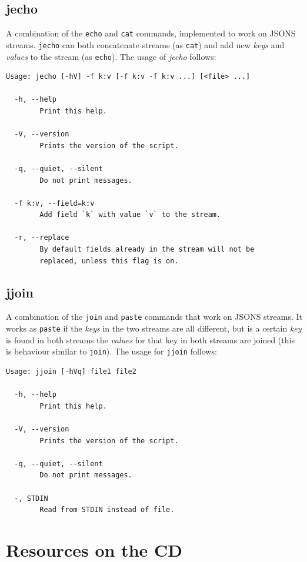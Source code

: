 \documentclass[11pt,a4paper,twoside,openright]{report}
\begin{document}
\section{jecho}

A combination of the \texttt{echo} and \texttt{cat} commands, implemented to
work on JSONS streams.  \texttt{jecho} can both concatenate streams (as
\texttt{cat}) and add new \emph{keys} and \emph{values} to the stream (as
\texttt{echo}).  The usage of \emph{jecho} follows:

{\small
\begin{Verbatim}[samepage=true]
Usage: jecho [-hV] -f k:v [-f k:v -f k:v ...] [<file> ...]

  -h, --help
        Print this help.

  -V, --version
        Prints the version of the script.

  -q, --quiet, --silent
        Do not print messages.

  -f k:v, --field=k:v
        Add field `k` with value `v` to the stream.

  -r, --replace
        By default fields already in the stream will not be
        replaced, unless this flag is on.
\end{Verbatim}
}

\section{jjoin}

A combination of the \texttt{join} and \texttt{paste} commands that work on
JSONS streams.  It works as \texttt{paste} if the \emph{keys} in the two
streams are all different, but is a certain \emph{key} is found in both streams
the \emph{values} for that key in both streams are joined (this is behaviour
similar to \texttt{join}).  The usage for \texttt{jjoin} follows:

{\small
\begin{Verbatim}[samepage=true]
Usage: jjoin [-hVq] file1 file2

  -h, --help
        Print this help.

  -V, --version
        Prints the version of the script.

  -q, --quiet, --silent
        Do not print messages.

  -, STDIN
        Read from STDIN instead of file.
\end{Verbatim}
}

\chapter{Resources on the CD}
\label{chap:resources}
\end{document}
